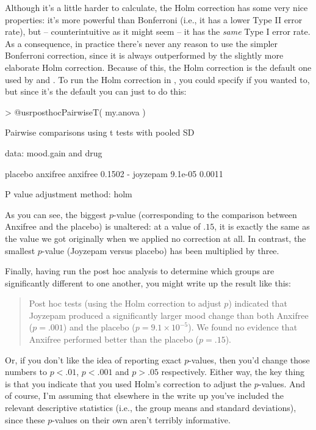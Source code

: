 Although it's a little harder to calculate, the Holm correction has some very nice properties: it's more powerful than Bonferroni (i.e., it has a lower Type II error rate), but -- counterintuitive as it might seem -- it has the {\it same} Type I error rate. As a consequence, in practice there's never any reason to use the simpler Bonferroni correction, since it is always outperformed by the slightly more elaborate Holm correction. Because of this, the Holm correction is the default one used by  and . To run the Holm correction in \R, you could specify  if you wanted to, but since it's the default you can just to do this:
\begin{rblock1}
> @usr{posthocPairwiseT( my.anova )}

	Pairwise comparisons using t tests with pooled SD 

data:  mood.gain and drug 

         placebo anxifree
anxifree 0.1502  -       
joyzepam 9.1e-05 0.0011  

P value adjustment method: holm 
\end{rblock1}
As you can see, the biggest $p$-value (corresponding to the comparison between Anxifree and the placebo) is unaltered: at a value of $.15$, it is exactly the same as the value we got originally when we applied no correction at all. In contrast, the smallest $p$-value (Joyzepam versus placebo) has been multiplied by three. 




Finally, having run the post hoc analysis to determine which groups are significantly different to one another, you might write up the result like this:
\begin{quote}
Post hoc tests (using the Holm correction to adjust $p$) indicated that Joyzepam produced a significantly larger mood change than both Anxifree ($p = .001$) and the placebo ($p = 9.1 \times 10^{-5}$). We found no evidence that Anxifree performed better than the placebo ($p = .15$).
\end{quote}
Or, if you don't like the idea of reporting exact $p$-values, then you'd change those numbers to $p<.01$, $p<.001$ and $p > .05$ respectively. Either way, the key thing is that you indicate that you used Holm's correction to adjust the $p$-values. And of course, I'm assuming that elsewhere in the write up you've included the relevant descriptive statistics (i.e., the group means and standard deviations), since these $p$-values on their own aren't terribly informative. 




